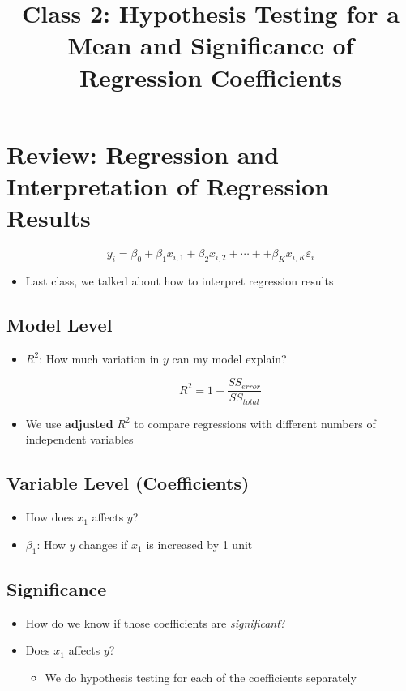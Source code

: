 \documentclass[10pt,article]{article}
\date{\vspace{-6ex}}
\title{Class 2: Hypothesis Testing for a Mean and Significance of Regression Coefficients}
\begin{document}
\maketitle
{} 
\thispagestyle{fancy}

\setcounter{tocdepth}{1}
\tableofcontents
\vspace{6ex}

\section{Review: Regression and Interpretation of Regression Results}
\label{sec:orgaba09e3}
\[  y_{i} = \beta_0 + \beta_1 x_{i, 1}  + \beta_2 x_{i, 2} + \cdots +  + \beta_K x_{i, K}  \varepsilon_{i} \]

\begin{itemize}
\item Last class, we talked about how to interpret regression results
\end{itemize}

\subsection{Model Level}
\label{sec:orga34da2d}
\begin{itemize}
\item \(R^2\): How much variation in \(y\) can my model explain?

\[ R^{2} = 1 - \dfrac{SS_{error}}{SS_{total}} \]
\item We use \textbf{adjusted} \(R^2\) to compare regressions with
different numbers of independent variables
\end{itemize}

\subsection{Variable Level (Coefficients)}
\label{sec:org2f84842}
\begin{itemize}
\item How does \(x_1\) affects \(y\)?
\item \(\beta_1\): How \(y\) changes if \(x_1\) is increased by 1 unit
\end{itemize}
\subsection{Significance}
\label{sec:orgaca2597}
\begin{itemize}
\item How do we know if those coefficients are \emph{significant}?
\item Does \(x_1\) affects \(y\)?

\begin{itemize}
\item We do hypothesis testing for each of the coefficients separately
\end{itemize}
\end{itemize}
\end{document}
